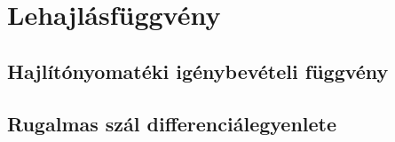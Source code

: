 \section{Lehajlásfüggvény}

\subsection{Hajlítónyomatéki igénybevételi függvény}

\subsection{Rugalmas szál differenciálegyenlete}
